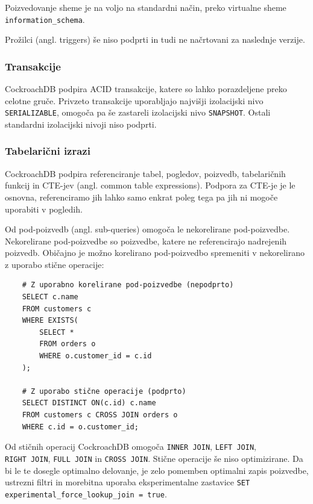 \documentclass[a4paper, 12pt]{book}
\begin{document}
Poizvedovanje sheme je na voljo na standardni način, preko virtualne sheme \texttt{information\_schema}.

Prožilci (angl. triggers) še niso podprti in tudi ne načrtovani za naslednje verzije.

\subsubsection{Transakcije}
CockroachDB podpira ACID transakcije, katere so lahko porazdeljene preko celotne gruče. Privzeto transakcije uporabljajo najvišji izolacijski nivo \texttt{SERI\-ALIZABLE}, omogoča pa še zastareli izolacijski nivo \texttt{SNAPSHOT}. Ostali standardni izolacijski nivoji niso podprti.

\subsubsection{Tabelarični izrazi}
CockroachDB podpira referenciranje tabel, pogledov, poizvedb, tabelaričnih funkcij in CTE-jev (angl. common table expressions). Podpora za CTE-je je le osnovna, referenciramo jih lahko samo enkrat poleg tega pa jih ni mogoče uporabiti v pogledih.

Od pod-poizvedb (angl. sub-queries) omogoča le nekorelirane pod-poiz\-vedbe. Nekorelirane pod-poizvedbe so poizvedbe, katere ne referencirajo nadrejenih poizvedb. Običajno je možno korelirano pod-poizvedbo spremeniti v nekorelirano z uporabo stične operacije:

\begin{listing}[H]
\begin{verbatim}
    # Z uporabno korelirane pod-poizvedbe (nepodprto)
    SELECT c.name
    FROM customers c
    WHERE EXISTS(
        SELECT *
        FROM orders o
        WHERE o.customer_id = c.id
    );

    # Z uporabo stične operacije (podprto)
    SELECT DISTINCT ON(c.id) c.name
    FROM customers c CROSS JOIN orders o
    WHERE c.id = o.customer_id;
\end{verbatim}
\label{code-correlated-sub-queries}
\end{listing}

Od stičnih operacij CockroachDB omogoča \texttt{INNER JOIN}, \texttt{LEFT JOIN},\\\texttt{RIGHT JOIN}, \texttt{FULL JOIN} in \texttt{CROSS JOIN}. Stične operacije še niso optimizirane. Da bi le te dosegle optimalno delovanje, je zelo pomemben optimalni zapis poizvedbe, ustrezni filtri in morebitna uporaba eksperimentalne zastavice \texttt{SET experimental\_force\_lookup\_join = true}.
\end{document}
